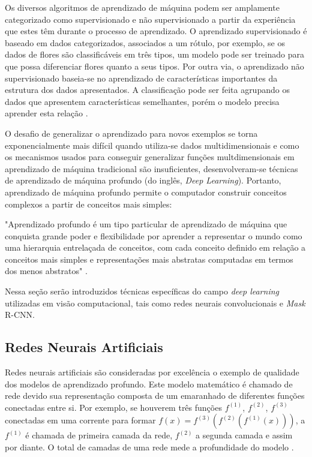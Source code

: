 \documentclass[12pt]{report}
\begin{document}
Os diversos algoritmos de aprendizado de máquina podem ser amplamente categorizado como supervisionado e não supervisionado a partir da experiência que estes têm durante o processo de aprendizado. O aprendizado supervisionado é baseado em dados categorizados, associados a um rótulo, por exemplo, se os dados de flores são classificáveis em três tipos, um modelo pode ser treinado para que possa diferenciar flores quanto a seus tipos. Por outra via, o aprendizado não supervisionado baseia-se no aprendizado de características importantes da estrutura dos dados apresentados. A classificação pode ser feita agrupando os dados que apresentem características semelhantes, porém o modelo precisa aprender esta relação \cite{Goodfellow}.

O desafio de generalizar o aprendizado para novos exemplos se torna exponencialmente mais difícil quando utiliza-se dados multidimensionais e como os mecanismos usados para conseguir generalizar funções multdimensionais em aprendizado de máquina tradicional são insuficientes, desenvolveram-se técnicas de aprendizado de máquina profundo (do inglês, \textit{Deep Learning}). Portanto, aprendizado de máquina profundo permite o computador construir conceitos complexos a partir de conceitos mais simples:

\begin{adjustwidth}{2.5em}{}

"Aprendizado profundo é um tipo particular de aprendizado de máquina que conquista grande poder e flexibilidade por aprender a representar o mundo como uma hierarquia entrelaçada de conceitos, com cada conceito definido em relação a conceitos mais simples e representações mais abstratas computadas em termos dos menos abstratos" \cite{Goodfellow}.

\end{adjustwidth}

Nessa seção serão introduzidos técnicas específicas do campo \textit{deep learning} utilizadas em visão computacional, tais como redes neurais convolucionais e \textit{Mask} R-CNN. 

\subsection{Redes Neurais Artificiais}

Redes neurais artificiais são consideradas por excelência o exemplo de qualidade dos modelos de aprendizado profundo. Este modelo matemático é chamado de rede devido sua representação composta de um emaranhado de diferentes funções conectadas entre si. Por exemplo, se houverem três funções $f^{(1)}$, $f^{(2)}$, $f^{(3)}$ conectadas em uma corrente para formar $f(x) = f^{(3)}(f^{(2)}(f^{(1)}(x)))$, a $f^{(1)}$ é chamada de primeira camada da rede, $f^{(2)}$ a segunda camada e assim por diante. O total de camadas de uma rede mede a profundidade do modelo \cite{Goodfellow}.
\end{document}
